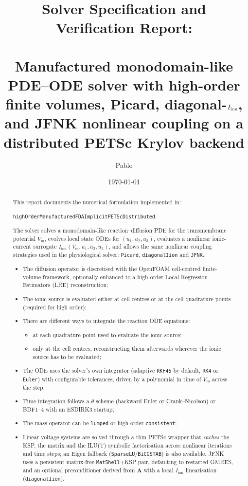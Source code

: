 \documentclass[11pt,a4paper]{article}
\title{Solver Specification and Verification Report:\\
       \texorpdfstring{\code{highOrderManufacturedFDAImplicitPETScDistributed}}{highOrderManufacturedFDAImplicitPETScDistributed}\\
       \large Manufactured monodomain-like PDE--ODE solver with high-order finite volumes,
       Picard, diagonal-\texorpdfstring{$\Iion$}{Iion}, and JFNK nonlinear coupling on a
       distributed PETSc Krylov backend}
\author{Pablo}
\date{\today}
\newcommand{\code}[1]{\texttt{\small #1}}
\newcommand{\Vm}{V_{\text{m}}}
\newcommand{\Iion}{I_{\mathrm{ion}}}
\newcommand{\Aimp}{\mathbf{A}}
\begin{document}
\maketitle

\begin{abstract}
This report documents the numerical formulation implemented in:

\begin{center}
\code{highOrderManufacturedFDAImplicitPETScDistributed}.
\end{center}

The solver solves a monodomain-like reaction--diffusion PDE for the
transmembrane potential $\Vm$, evolves local state ODEs for $(u_1,u_2,u_3)$,
evaluates a nonlinear ionic-current surrogate $\Iion(\Vm,u_1,u_2,u_3)$, and
allows the same nonlinear coupling strategies used in the physiological solver:
\code{Picard}, \code{diagonalIion} and \code{JFNK}.


\begin{itemize}
	\item The diffusion operator is discretised with the OpenFOAM cell-centred
	finite-volume framework, optionally enhanced to a high-order Local
	Regression Estimators (LRE) reconstruction;
	\item The ionic source is evaluated either at cell centres or at the cell
	quadrature points (required for high order);
	\item There are different ways to integrate the reaction ODE equations:
	\begin{itemize}
		\item[(i)] at each quadrature point used to evaluate the ionic source;
		\item[(ii)] only at the cell centres, reconstructing them afterwards wherever the ionic source has to be evaluated;
	\end{itemize}
	\item The ODE uses the solver's own integrator (adaptive \code{RKF45} by
	default, \code{RK4} or \code{Euler}) with configurable tolerances, driven by a
	polynomial in time of $\Vm$ across the step;
	\item Time integration follows a $\theta$ scheme (backward Euler or
	Crank--Nicolson) or BDF1--4 with an ESDIRK3 startup;
	\item The mass operator can be \code{lumped} or high-order \code{consistent};
	\item Linear voltage systems are solved through a thin PETSc wrapper that
	\emph{caches} the KSP, the matrix and the ILU(T) symbolic factorisation across
	nonlinear iterations and time steps; an Eigen fallback
	(\code{SparseLU}/\code{BiCGSTAB}) is also available. JFNK uses a persistent
	matrix-free \code{MatShell}+KSP pair, defaulting to restarted GMRES, and an
	optional preconditioner derived from $\Aimp$ with a local $\Iion$
	linearisation (\code{diagonalIion}).
\end{itemize}


\end{abstract}
\end{document}
